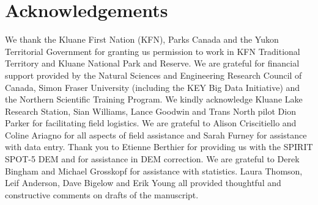 \documentclass{article}
\begin{document}


\section{Acknowledgements}

We thank the Kluane First Nation (KFN), Parks Canada and the Yukon Territorial Government for granting us permission to work in KFN Traditional Territory and Kluane National Park and Reserve. We are grateful for financial support provided by the Natural Sciences and Engineering Research Council of Canada, Simon Fraser University (including the KEY Big Data Initiative) and the Northern Scientific Training Program. We kindly acknowledge Kluane Lake Research Station, Sian Williams, Lance Goodwin and Trans North pilot Dion Parker for facilitating field logistics. We are grateful to Alison Criscitiello and Coline Ariagno for all aspects of field assistance and Sarah Furney for assistance with data entry. Thank you to Etienne Berthier for providing us with the SPIRIT SPOT-5 DEM and for assistance in DEM correction. We are grateful to Derek Bingham and Michael Grosskopf for assistance with statistics. Laura Thomson, Leif Anderson, Dave Bigelow and Erik Young all provided thoughtful and constructive comments on drafts of the manuscript.


%
%
%



\end{document}
